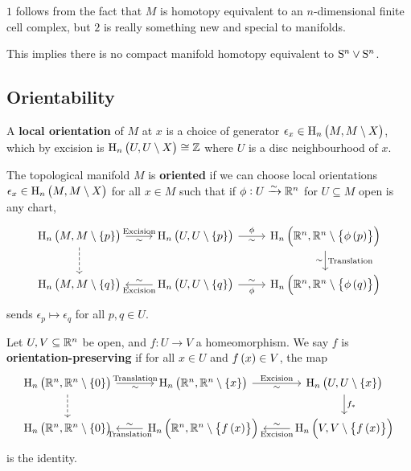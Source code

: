 \begin{remark*}
$ 1 $ follows from the fact that $ M $ is homotopy equivalent to an $ n $-dimensional finite cell complex, but $ 2 $ is really something new and special to manifolds.
\end{remark*}

\begin{example*}
This implies there is no compact manifold homotopy equivalent to $ \S^n \vee \S^n $.
\end{example*}

\subsection{Orientability}


\begin{definition*}
A \textbf{local orientation} of $ M $ at $ x $ is a choice of generator $ \epsilon_x \in \H_n\br{M, M \setminus X} $, which by excision is $ \H_n\br{U, U \setminus X} \cong \ZZ $ where $ U $ is a disc neighbourhood of $ x $.
\end{definition*}

\begin{definition*}
The topological manifold $ M $ is \textbf{oriented} if we can choose local orientations $ \epsilon_x \in \H_n\br{M, M \setminus X} $ for all $ x \in M $ such that if $ \phi : U \xrightarrow{\sim} \RR^n $ for $ U \subseteq M $ open is any chart,
$$
\begin{tikzcd}
\H_n\br{M, M \setminus \cbr{p}} \arrow{r}{\text{Excision}}[swap]{\sim} \arrow[dashed]{d} & \H_n\br{U, U \setminus \cbr{p}} \arrow{r}{\phi}[swap]{\sim} & \H_n\br{\RR^n, \RR^n \setminus \cbr{\phi\br{p}}} \arrow{d}{\text{Translation}}[swap]{\sim} \\
\H_n\br{M, M \setminus \cbr{q}} & \H_n\br{U, U \setminus \cbr{q}} \arrow{l}{\text{Excision}}[swap]{\sim} \arrow{r}{\sim}[swap]{\phi} & \H_n\br{\RR^n, \RR^n \setminus \cbr{\phi\br{q}}}
\end{tikzcd}
$$
sends $ \epsilon_p \mapsto \epsilon_q $ for all $ p, q \in U $.
\end{definition*}

\begin{definition*}
Let $ U, V \subseteq \RR^n $ be open, and $ f : U \to V $ a homeomorphism. We say $ f $ is \textbf{orientation-preserving} if for all $ x \in U $ and $ f\br{x} \in V $, the map
$$
\begin{tikzcd}
\H_n\br{\RR^n, \RR^n \setminus \cbr{0}} \arrow{r}{\text{Translation}}[swap]{\sim} \arrow[dashed]{d} & \H_n\br{\RR^n, \RR^n \setminus \cbr{x}} \arrow{r}{\text{Excision}}[swap]{\sim} & \H_n\br{U, U \setminus \cbr{x}} \arrow{d}{f_*} \\
\H_n\br{\RR^n, \RR^n \setminus \cbr{0}} & \H_n\br{\RR^n, \RR^n \setminus \cbr{f\br{x}}} \arrow{l}{\text{Translation}}[swap]{\sim} & \H_n\br{V, V \setminus \cbr{f\br{x}}} \arrow{l}{\text{Excision}}[swap]{\sim}
\end{tikzcd}
$$
is the identity.
\end{definition*}

